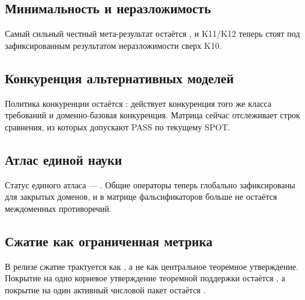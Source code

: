 \subsection{Минимальность и неразложимость}
Самый сильный честный мета-результат остаётся , и K11/K12 теперь стоят под зафиксированным результатом неразложимости сверх K10.

\subsection{Конкуренция альтернативных моделей}
Политика конкуренции остаётся : действует конкуренция того же класса требований и доменно-базовая конкуренция. Матрица сейчас отслеживает  строк сравнения, из которых  допускают PASS по текущему SPOT.

\subsection{Атлас единой науки}
Статус единого атласа — . Общие операторы теперь глобально зафиксированы для закрытых доменов, и в матрице фальсификаторов больше не остаётся междоменных противоречий.

\subsection{Сжатие как ограниченная метрика}
В релизе сжатие трактуется как , а не как центральное теоремное утверждение. Покрытие на одно корневое утверждение теоремной поддержки остаётся , а покрытие на один активный числовой пакет остаётся .
